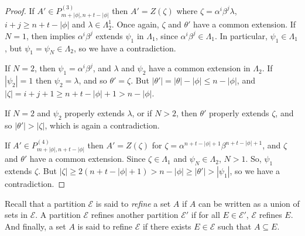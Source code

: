 \documentclass[12pt]{amsart}
\newcommand{\sse}{\subseteq}
\newcommand{\mc}[1]{\mathcal{#1}}
\newcommand{\al}{\alpha}
\newcommand{\be}{\beta}
\newcommand{\ze}{\zeta}
\renewcommand{\th}{\theta}
\newcommand{\la}{\lambda}
\newcommand{\La}{\Lambda}
\theoremstyle{plain} %
\theoremstyle{definition} %
\begin{document}
\begin{proof}
    If $A' \in P^{(3)}_{m+|\phi|, n+t-|\phi|}$ then $A' = Z(\ze)$ where $\ze = \al^i \be^j \la$, $i + j \geq n+t-|\phi|$ and $\la \in \La_2^1$. Once again, $\ze$ and $\th'$ have a common extension. If $N = 1$, then \cite[Lemma 3.4]{MS22} implies $\al^i\be^j$ extends $\psi_1$ in $\La_1$, since $\al^i \be^j \in \La_1$. In particular, $\psi_1 \in \La_1$, but $\psi_1 = \psi_N \in \La_2$, so we have a contradiction.

    If $N =2$, then $\psi_1 = \al^i \be^j$, and $\la$ and $\psi_2$ have a common extension in $\La_2$. If $|\psi_2| = 1$ then $\psi_2 = \la$, and so $\th' = \ze$. But $|\th'| = |\th| - |\phi| \leq n - |\phi|$, and $|\ze| = i +j + 1 \geq n+t -|\phi| + 1 > n-|\phi|$.

    If $N=2$ and $\psi_2$ properly extends $\la$, or if $N > 2$, then $\th'$ properly extends $\ze$, and so $|\th'| > |\ze|$, which is again a contradiction.

    If $A' \in P^{(4)}_{m+|\phi|, n+t-|\phi|}$ then $A' = Z(\ze)$ for $\ze = \al^{n+t-|\phi|+1} \be^{n+t-|\phi|+1}$, and $\ze$ and $\th'$ have a common extension. Since $\ze \in \La_1$ and $\psi_N \in \La_2$, $N > 1$. So, $\psi_1$ extends $\ze$. But $|\ze| \geq 2(n+t -|\phi|+1) > n-|\phi| \geq |\th'| > |\psi_1|$, so we have a contradiction.
\end{proof}

Recall that a partition $\mc{E}$ is said to \textit{refine} a set $A$ if $A$ can be written as a union of sets in $\mc{E}$. A partition $\mc{E}$ refines another partition $\mc{E}'$ if for all $E \in \mc{E}'$, $\mc{E}$ refines $E$. And finally, a set $A$ is said to refine $\mc{E}$ if there exists $E \in \mc{E}$ such that $A \sse E$.
%
\end{document}
